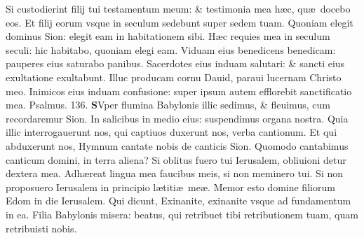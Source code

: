 \documentclass[a5paper,10pt]{book}
\def\ae{æ}
\begin{document}
\begin{multicols*}{2}
\newline \color{red} S\color{black}i custodierint filij tui testamentum meum: \& testimonia mea h\ae c, qu\ae \ docebo eos.
\newline \color{red} E\color{black}t filij eorum vsque in seculum sedebunt super sedem tuam.
\newline \color{red} Q\color{black}uoniam elegit dominus Sion: elegit eam in habitationem sibi.
\newline \color{red} H\color{black}\ae c requies mea in seculum seculi: hic habitabo, quoniam elegi eam.
\newline \color{red} V\color{black}iduam eius benedicens benedicam: pauperes eius saturabo panibus.
\newline \color{red} S\color{black}acerdotes eius induam salutari: \& sancti eius exultatione exultabunt.
\newline \color{red} I\color{black}lluc producam cornu Dauid, paraui lucernam Christo meo.
\newline \color{red} I\color{black}nimicos eius induam confusione: super ipsum autem efflorebit sanctificatio mea. \quad \color{red} Psalmus. 136. \color{black}
\lettrine[lines=2]{\bfseries \color{red} S}{}Vper flumina Babylonis illic sedimus, \& fleuimus, cum recordaremur Sion.
\newline \color{red} I\color{black}n salicibus in medio eius: suspendimus organa nostra.
\newline \color{red} Q\color{black}uia illic interrogauerunt nos, qui captiuos duxerunt nos, verba cantionum.
\newline \color{red} E\color{black}t qui abduxerunt nos, Hymnum cantate nobis de canticis Sion.
\newline \color{red} Q\color{black}uomodo cantabimus canticum domini, in terra aliena?
\newline \color{red} S\color{black}i oblitus fuero tui Ierusalem, obliuioni detur dextera mea.
\newline \color{red} A\color{black}dh\ae reat lingua mea faucibus meis, si non meminero tui.
\newline \color{red} S\color{black}i non proposuero Ierusalem in principio l\ae titi\ae \ me\ae .
\newline \color{red} M\color{black}emor esto domine filiorum Edom in die Ierusalem.
\newline \color{red} Q\color{black}ui dicunt, Exinanite, exinanite vsque ad fundamentum in ea.
\newline \color{red} F\color{black}ilia Babylonis misera: beatus, qui retribuet tibi retributionem tuam, quam retribuisti nobis.

\end{multicols*}
\end{document}
